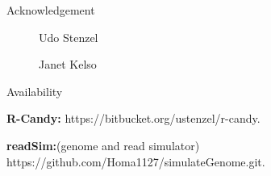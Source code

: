 \documentclass{beamer}
\begin{document}
\begin{frame}{Acknowledgement}



	 \begin{figure}
        \begin{minipage}{.35\textwidth}
            \centering
            {\caption*{Udo Stenzel}}
        \end{minipage}%
        \begin{minipage}{.35\textwidth}
           \centering
            \captionsetup{labelformat=empty}
             \caption{Janet Kelso}
        \end{minipage}
    \end{figure}
 
	

\end{frame}
\begin{frame}{Availability}

\textbf{R-Candy:} https://bitbucket.org/ustenzel/r-candy.

\vskip 0.5cm

\textbf{readSim:}(genome and read simulator) 
\hspace{55pt}\hspace{55pt} https://github.com/Homa1127/simulateGenome.git.

\end{frame}
\end{document}
